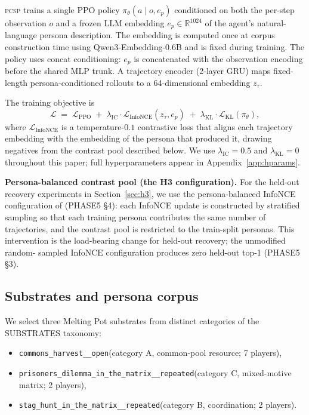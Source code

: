 \documentclass[11pt]{article}
\newcommand{\PCSP}{\textsc{pcsp}\xspace}
\newcommand{\InfoNCE}{InfoNCE\xspace}
\newcommand{\cH}{\texttt{commons\_harvest\_\_open}\xspace}
\newcommand{\PD}{\texttt{prisoners\_dilemma\_in\_the\_matrix\_\_repeated}\xspace}
\newcommand{\stag}{\texttt{stag\_hunt\_in\_the\_matrix\_\_repeated}\xspace}
\begin{document}
\PCSP trains a single PPO policy $\pi_\theta(a \mid o, e_p)$ conditioned on
both the per-step observation $o$ and a frozen LLM embedding $e_p \in
\mathbb{R}^{1024}$ of the agent's natural-language persona description. The
embedding is computed once at corpus construction time using
Qwen3-Embedding-0.6B and is fixed during training. The policy uses concat
conditioning: $e_p$ is concatenated with the observation encoding before the
shared MLP trunk. A trajectory encoder (2-layer GRU) maps fixed-length
persona-conditioned rollouts to a 64-dimensional embedding $z_\tau$.

The training objective is
\[
  \mathcal{L} \;=\; \mathcal{L}_{\text{PPO}}
  \;+\; \lambda_{\text{IC}} \cdot \mathcal{L}_{\text{InfoNCE}}(z_\tau, e_p)
  \;+\; \lambda_{\text{KL}} \cdot \mathcal{L}_{\text{KL}}(\pi_\theta),
\]
where $\mathcal{L}_{\text{InfoNCE}}$ is a temperature-$0.1$ contrastive loss
that aligns each trajectory embedding with the embedding of the persona that
produced it, drawing negatives from the contrast pool described below. We use
$\lambda_{\text{IC}} = 0.5$ and $\lambda_{\text{KL}} = 0$ throughout this
paper; full hyperparameters appear in Appendix~\ref{app:hparams}.

\textbf{Persona-balanced contrast pool (the H3 configuration).} For the
held-out recovery experiments in Section~\ref{sec:h3}, we use the
persona-balanced \InfoNCE configuration of \cite{phase5report} (PHASE5
\S4): each \InfoNCE update is constructed by stratified sampling so that
each training persona contributes the same number of trajectories, and the
contrast pool is restricted to the train-split personas. This intervention
is the load-bearing change for held-out recovery; the unmodified random-
sampled \InfoNCE configuration produces zero held-out top-1 (PHASE5 \S3).

\subsection{Substrates and persona corpus}
\label{sec:method:substrates}

We select three Melting Pot substrates from distinct categories of the
SUBSTRATES taxonomy:

\begin{itemize}
\item \cH (category A, common-pool resource; 7 players),
\item \PD (category C, mixed-motive matrix; 2 players),
\item \stag (category B, coordination; 2 players).
\end{itemize}
\end{document}
